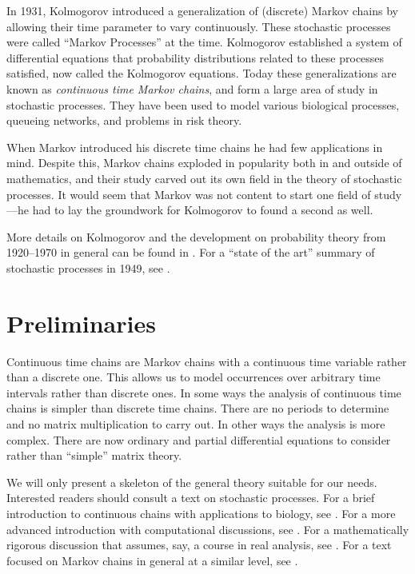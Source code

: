 \documentclass[12pt]{article}
\theoremstyle{definition}
\begin{document}
In 1931, Kolmogorov introduced a generalization of (discrete) Markov chains by
allowing their time parameter to vary continuously. These stochastic processes
were called ``Markov Processes'' at the time. Kolmogorov established a system
of differential equations that probability distributions related to these
processes satisfied, now called the Kolmogorov equations. Today these
generalizations are known as \emph{continuous time Markov chains}, and form a
large area of study in stochastic processes. They have been used to model
various biological processes, queueing networks, and problems in risk theory.

When Markov introduced his discrete time chains he had few applications in
mind. Despite this, Markov chains exploded in popularity both in and outside of
mathematics, and their study carved out its own field in the theory of
stochastic processes. It would seem that Markov was not content to start one
field of study---he had to lay the groundwork for Kolmogorov to found a second
as well.

More details on Kolmogorov and the development on probability theory from
1920--1970 in general can be found in \cite{cramer1976century}. For a ``state
of the art'' summary of stochastic processes in 1949, see
\cite{feller1949theory}.

\section{Preliminaries}
\label{sec:preliminaries}

Continuous time chains are Markov chains with a continuous time variable rather
than a discrete one. This allows us to model occurrences over arbitrary time
intervals rather than discrete ones. In some ways the analysis of continuous
time chains is simpler than discrete time chains. There are no periods to
determine and no matrix multiplication to carry out. In other ways the analysis
is more complex. There are now ordinary and partial differential equations to
consider rather than ``simple'' matrix theory.

We will only present a skeleton of the general theory suitable for our needs.
Interested readers should consult a text on stochastic processes. For a brief
introduction to continuous chains with applications to biology, see
\citet{allen2010introduction}. For a more advanced introduction with
computational discussions, see \citet{kao1997introduction}. For a
mathematically rigorous discussion that assumes, say, a course in real
analysis, see \citet{berger2012introduction}. For a text focused on Markov
chains in general at a similar level, see \citet{bremaud1998markov}.
\end{document}
